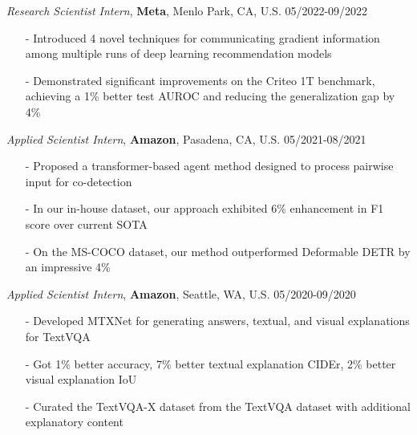 \documentclass[margin]{res}
\begin{document}
\begin{resume}
				\vspace{-1em}

				{\it Research Scientist Intern}, \textbf{Meta}, Menlo Park, CA, U.S. \hfill 05/2022-09/2022
                \begin{itemize}\itemsep -2.2pt %
                \item[-] Introduced 4 novel techniques for communicating gradient information among multiple runs of deep learning recommendation models
                \item[-] Demonstrated significant improvements on the Criteo 1T benchmark, achieving a 1\% better test AUROC and reducing the generalization gap by 4\%
                 \end{itemize}

				\vspace{-1em}
				{\it Applied Scientist Intern}, \textbf{Amazon}, Pasadena, CA, U.S. \hfill 05/2021-08/2021
                \begin{itemize}\itemsep -2.2pt %
                \item[-] Proposed a transformer-based agent method designed to process pairwise input for co-detection
                \item[-] In our in-house dataset, our approach exhibited 6\% enhancement in F1 score over current SOTA
                \item[-] On the MS-COCO dataset, our method outperformed Deformable DETR by an impressive 4\%
                 \end{itemize}
                
                \vspace{-1em}
                {\it Applied Scientist Intern}, \textbf{Amazon}, Seattle, WA, U.S. \hfill 05/2020-09/2020
                \begin{itemize}\itemsep -2.2pt %
                \item[-] Developed MTXNet for generating answers, textual, and visual explanations for TextVQA 
                \item[-] Got 1\% better accuracy, 7\% better textual explanation CIDEr, 2\% better visual explanation IoU
                 \item[-] Curated the TextVQA-X dataset from the TextVQA dataset with additional explanatory content
                 \end{itemize}
                

\end{resume}
\end{document}
